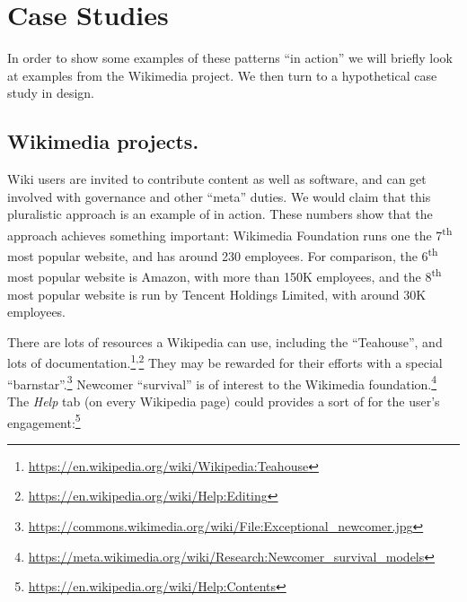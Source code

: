 \section{Case Studies}\label{sec:Case Studies}

In order to show some examples of these patterns ``in action'' we will
briefly look at examples from the Wikimedia project.  We then turn to
a hypothetical case study in design.

\subsection{Wikimedia projects.}

Wiki users are invited to contribute content as well as software, and
can get involved with governance and other ``meta'' duties.  We would
claim that this pluralistic approach is an example of
 in action.  These numbers show that the
approach achieves something important: Wikimedia Foundation runs one
the 7\textsuperscript{th} most popular website, and has around 230
employees.  For comparison, the 6\textsuperscript{th} most popular
website is Amazon, with more than 150K employees, and the
8\textsuperscript{th} most popular website is run by Tencent Holdings
Limited, with around 30K employees.

There are lots of resources a Wikipedia 
can use, including the ``Teahouse'', and lots of
documentation.\footnote{\url{https://en.wikipedia.org/wiki/Wikipedia:Teahouse}}\textsuperscript{,}\footnote{\url{https://en.wikipedia.org/wiki/Help:Editing}}
They may be rewarded for their efforts with a special
``barnstar''.\footnote{\url{https://commons.wikimedia.org/wiki/File:Exceptional_newcomer.jpg}}
Newcomer ``survival'' is of interest to the Wikimedia
foundation.\footnote{\url{https://meta.wikimedia.org/wiki/Research:Newcomer_survival_models}}
%
The \emph{Help} tab (on every Wikipedia page) could provides a sort of
 for the user's
engagement:\footnote{\url{https://en.wikipedia.org/wiki/Help:Contents}}

